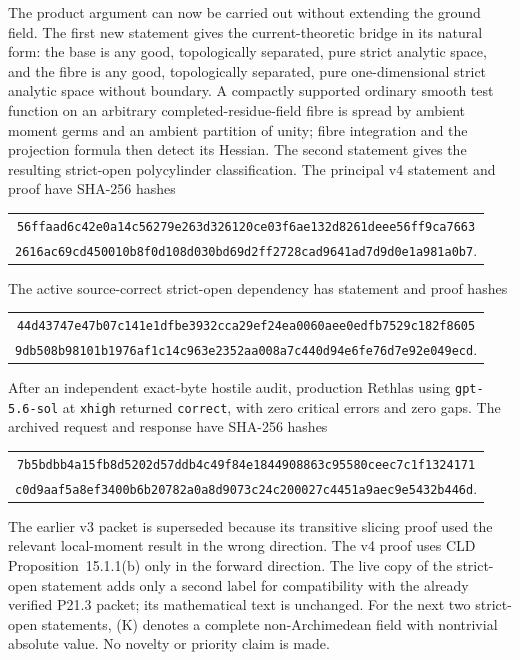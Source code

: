 The product argument can now be carried out without extending the ground
field.  The first new statement gives the current-theoretic bridge in its
natural form: the base is any good, topologically separated, pure strict
analytic space, and the fibre is any good, topologically separated, pure
one-dimensional strict analytic space without boundary.  A compactly
supported ordinary smooth test function on an arbitrary
completed-residue-field fibre is spread by ambient moment germs and an
ambient partition of unity; fibre integration and the projection formula
then detect its Hessian.  The second statement gives the resulting
strict-open polycylinder classification.  The principal v4 statement and
proof have SHA-256 hashes
\begin{center}
\small
\begin{tabular}{@{}c@{}}
\nolinkurl{56ffaad6c42e0a14c56279e263d326120ce03f6ae132d8261deee56ff9ca7663}\\
\nolinkurl{2616ac69cd450010b8f0d108d030bd69d2ff2728cad9641ad7d9d0e1a981a0b7}.
\end{tabular}
\end{center}
The active source-correct strict-open dependency has statement and proof
hashes
\begin{center}
\small
\begin{tabular}{@{}c@{}}
\nolinkurl{44d43747e47b07c141e1dfbe3932cca29ef24ea0060aee0edfb7529c182f8605}\\
\nolinkurl{9db508b98101b1976af1c14c963e2352aa008a7c440d94e6fe76d7e92e049ecd}.
\end{tabular}
\end{center}
After an independent exact-byte hostile audit, production Rethlas using
\texttt{gpt-5.6-sol} at \texttt{xhigh} returned \texttt{correct}, with zero
critical errors and zero gaps.  The archived request and response have
SHA-256 hashes
\begin{center}
\small
\begin{tabular}{@{}c@{}}
\nolinkurl{7b5bdbb4a15fb8d5202d57ddb4c49f84e1844908863c95580ceec7c1f1324171}\\
\nolinkurl{c0d9aaf5a8ef3400b6b20782a0a8d9073c24c200027c4451a9aec9e5432b446d}.
\end{tabular}
\end{center}
The earlier v3 packet is superseded because its transitive slicing proof
used the relevant local-moment result in the wrong direction.  The v4 proof
uses CLD Proposition~15.1.1(b) only in the forward direction.  The live copy
of the strict-open statement adds only a second label for compatibility with
the already verified P21.3 packet; its mathematical text is unchanged.  For
the next two strict-open statements, (K) denotes a complete
non-Archimedean field with nontrivial absolute value.  No novelty or priority
claim is made.

